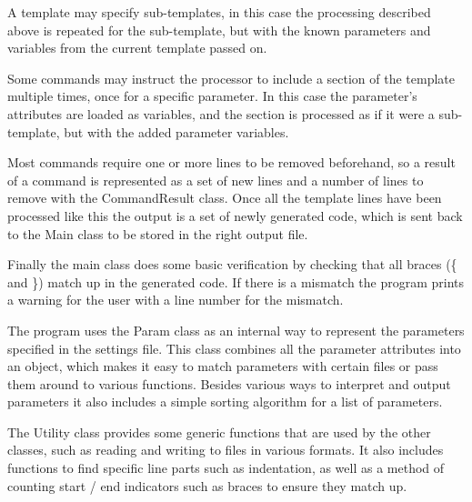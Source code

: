 \documentclass{settings/TU_Delft_Report}
\begin{document}
A template may specify sub-templates, in this case the processing described above is repeated for the sub-template, but with the known parameters and variables from the current template passed on.

Some commands may instruct the processor to include a section of the template multiple times, once for a specific parameter. In this case the parameter's attributes are loaded as variables, and the section is processed as if it were a sub-template, but with the added parameter variables.

Most commands require one or more lines to be removed beforehand, so a result of a command is represented as a set of new lines and a number of lines to remove with the CommandResult class. Once all the template lines have been processed like this the output is a set of newly generated code, which is sent back to the Main class to be stored in the right output file.

\vsp Finally the main class does some basic verification by checking that all braces (\{ and \}) match up in the generated code. If there is a mismatch the program prints a warning for the user with a line number for the mismatch.

\vsp The program uses the Param class as an internal way to represent the parameters specified in the settings file. This class combines all the parameter attributes into an object, which makes it easy to match parameters with certain files or pass them around to various functions. Besides various ways to interpret and output parameters it also includes a simple sorting algorithm for a list of parameters.

\vsp The Utility class provides some generic functions that are used by the other classes, such as reading and writing to files in various formats. It also includes functions to find specific line parts such as indentation, as well as a method of counting start / end indicators such as braces to ensure they match up.
\end{document}
